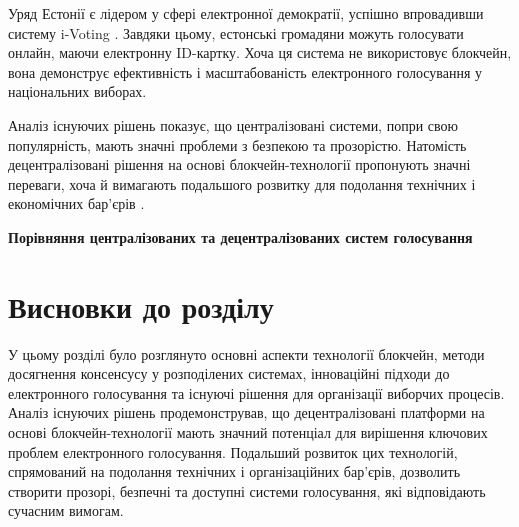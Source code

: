 \documentclass[14pt]{extreport}
\begin{document}
  Уряд Естонії є лідером у сфері електронної демократії, успішно впровадивши систему i-Voting \cite{ivoting}. Завдяки цьому, естонські громадяни можуть голосувати онлайн, маючи електронну ID-картку. Хоча ця система не використовує блокчейн, вона демонструє ефективність і масштабованість електронного голосування у національних виборах.

  Аналіз існуючих рішень показує, що централізовані системи, попри свою популярність, мають значні проблеми з безпекою та прозорістю. Натомість децентралізовані рішення на основі блокчейн-технології пропонують значні переваги, хоча й вимагають подальшого розвитку для подолання технічних і економічних бар'єрів \cite{ieee:almeida}.
  
  \begin{table}[H]
  \centering
  \renewcommand{\tablename}{Таблиця}
  \renewcommand{\thetable}{\thechapter.\arabic{table}.}
  \caption{}
  \textbf{Порівняння централізованих та децентралізованих систем голосування\vspace{5pt}}
  \label{tab:voting_systems_comparison}
  \end{table}
  
  \section{Висновки до розділу}
  
  У цьому розділі було розглянуто основні аспекти технології блокчейн, методи досягнення консенсусу у розподілених системах, інноваційні підходи до електронного голосування та існуючі рішення для організації виборчих процесів. Аналіз існуючих рішень продемонстрував, що децентралізовані платформи на основі блокчейн-технології мають значний потенціал для вирішення ключових проблем електронного голосування. Подальший розвиток цих технологій, спрямований на подолання технічних і організаційних бар’єрів, дозволить створити прозорі, безпечні та доступні системи голосування, які відповідають сучасним вимогам.
  
\end{document}
